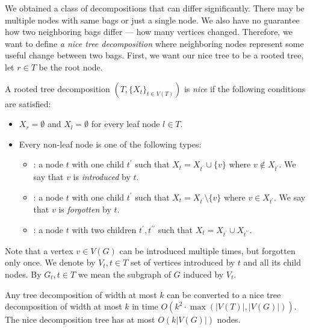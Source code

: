 We obtained a class of decompositions that can differ significantly.
There may be multiple nodes with same bags or just a single node.
We also have no guarantee how two neighboring bags differ --- how many vertices changed.
Therefore, we want to define \emph{a nice tree decomposition} where neighboring nodes
represent some useful change between two bags.
First, we want our nice tree to be a rooted tree,
let \( r \in T \) be the root node.
%
\begin{definition}
	A rooted tree decomposition
	\( (T, {\{X_t\}}_{t \in V ( T )}) \)
	is \emph{nice} if the following conditions are satisfied:
	\begin{itemize}
		\item \( X_r = \emptyset \) and \( X_l = \emptyset \) for every leaf node \( l \in T \).
		\item Every non-leaf node is one of the following types:
		      \begin{itemize}
			      \item \IntroduceVertexNode{}: a node \( t \) with one child \( t^\prime \)
			            such that \( X_t = X_{t^\prime} \cup \{v\} \) where \( v \not\in X_{t^\prime} \).
			            We say that \( v \) is \emph{introduced} by \( t \).
			      \item \ForgetVertexNode{}: a node \( t \) with one child \( t^\prime \)
			            such that \( X_t = X_{t^\prime} \setminus \{v\} \) where \( v \in X_{t^\prime} \).
			            We say that \( v \) is \emph{forgotten} by \( t \).
			      \item \JoinNode: a node \( t \) with two children \( t^\prime, t^{\prime\prime} \)
			            such that \( X_t = X_{t^\prime} \cup X_{t^{\prime\prime}} \).
		      \end{itemize}
	\end{itemize}
\end{definition}
%
Note that a vertex \( v \in V(G) \) can be introduced multiple times,
but forgotten only once.
We denote by \( V_t, t \in T \) set of vertices introduced by \( t \)
and all its child nodes.
By \( G_t, t \in T \) we mean the subgraph of \( G \) induced by \( V_t \).

\begin{lemma}
	Any tree decomposition of width at most \( k \) can be converted to
	a nice tree decomposition of width at most \( k \)
	in time \( O(k^2 \cdot \max(|V(T)|, |V(G)|)) \).
	The nice decomposition tree has at most \( O(k|V(G)|) \) nodes.
\end{lemma}

